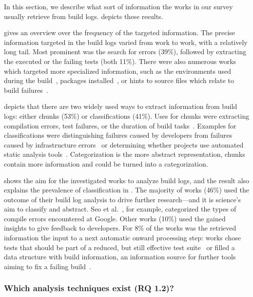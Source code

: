 In this section, we describe what sort of information the works in
our survey usually retrieve from build logs.
 depicts these results.

 gives an overview over the frequency of
the targeted information.
The precise information targeted in the build logs varied from work
to work, with a relatively long tail.
Most prominent was the search for errors (39\%), followed by extracting
the executed or the failing
tests (both 11\%).
There were also numerous works which targeted more specialized
information, such as the environments used during the
build~\cite{zolfagharinia2017not}, packages
installed~\cite{selberg2012use}, or hints to source files which
relate to build failures~\cite{ren2018automated}.

 depicts that there are two widely used ways to
extract information from build logs: either chunks (53\%) or
classifications (41\%).
Uses for chunks were extracting compilation errors,
test failures, or the duration of build
tasks~\cite{clemencic2014new,zhang2016android}.
Examples for
classifications were distinguishing failures caused by developers from
failures caused by infrastructure errors~\cite{lindqvist2019detection}
or determining whether projects use automated static analysis
tools~\cite{kavaler2019tool}.
Categorization is the more abstract representation, chunks
contain more information and could be turned into a categorization.

 shows the aim for the
investigated works to analyze build logs, and the result also explains
the prevalence of classification in .
The majority of works (46\%) used the outcome of their build log
analysis to drive further research---and it is science's aim to
classify and abstract.
Seo et al.~\cite{seo2014programmers}, for example,
categorized the types of compile errors encountered at
Google.
Other works (10\%) used the gained insights to give feedback to
developers.
For 8\% of the works was the retrieved information the input
to a next automatic onward processing step:
works chose
tests that should be part of a reduced, but still effective test
suite~\cite{shi2018evaluating} or filled     a data structure with
build information, an information source for further tools aiming
to fix a failing build~\cite{vassallo2018un-break}.

\subsubsection{Which analysis techniques exist (RQ 1.2)?}

